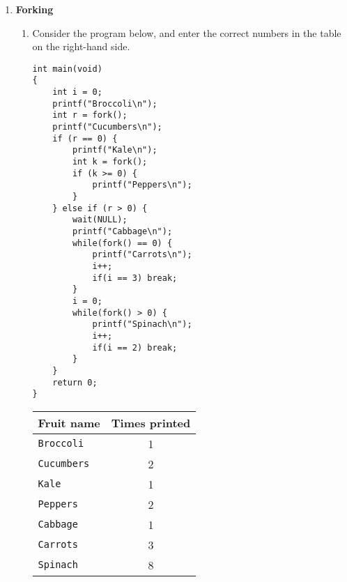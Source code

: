\documentclass[11pt]{article}
\begin{document}
\begin{enumerate}
	\newpage
	\item \textbf{Forking}
		\begin{enumerate}[{4.1}]
			\item Consider the program below, and enter the correct numbers in the table on the right-hand side.\\
				\begin{minipage}[t]{0.5\textwidth}
					\begin{Verbatim}
int main(void)
{
	int i = 0;
	printf("Broccoli\n");
	int r = fork();
	printf("Cucumbers\n");
	if (r == 0) {
		printf("Kale\n");
		int k = fork();
		if (k >= 0) {
			printf("Peppers\n");
		}
	} else if (r > 0) {
		wait(NULL);
		printf("Cabbage\n");
		while(fork() == 0) {
			printf("Carrots\n");
			i++;
			if(i == 3) break;
		}
		i = 0;
		while(fork() > 0) {
			printf("Spinach\n");
			i++;
			if(i == 2) break;
		}
	}
	return 0;
}

					\end{Verbatim}
				\end{minipage}
				\begin{minipage}[t]{0.5\textwidth}
					\vspace{1in}
					\hspace*{0.5cm}\begin{tabular}[t]{| l | c |}
						\hline
						\textbf{Fruit name} & \textbf{Times printed}\\
						\hline
						\Verb|Broccoli| & 1\\
						\hline
						\Verb|Cucumbers| & 2\\
						\hline
						\Verb|Kale| & 1\\
						\hline
						\Verb|Peppers| & 2\\
						\hline
						\Verb|Cabbage| & 1\\
						\hline
						\Verb|Carrots| & 3\\
						\hline
						\Verb|Spinach| & 8\\
						\hline
					\end{tabular}
				\end{minipage}


\end{enumerate}
\end{enumerate}
\end{document}
